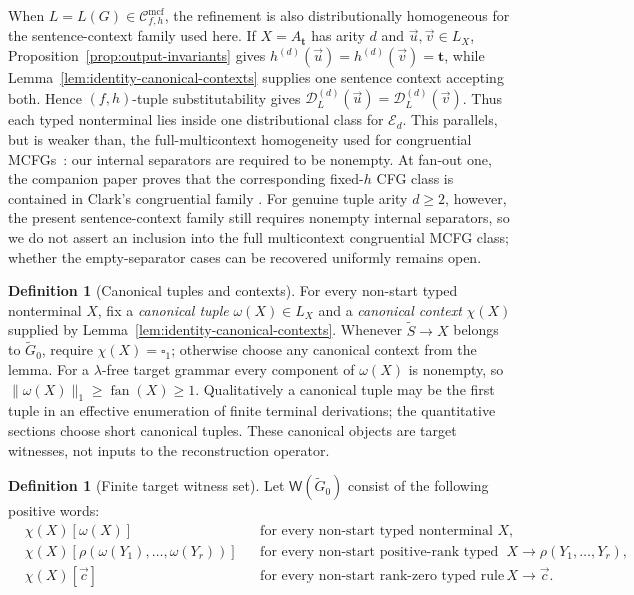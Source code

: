 \documentclass[11pt]{article}
\numberwithin{equation}{section}
\theoremstyle{plain}
\theoremstyle{definition}
\newtheorem{definition}[theorem]{Definition}
\theoremstyle{remark}
\newcommand{\Wit}{\mathsf{W}}
\newcommand{\Cmcf}[2]{\mathcal{C}^{\mathrm{mcf}}_{#1,#2}}
\newcommand{\D}{\mathcal{D}}
\newcommand{\tuple}[1]{\vec{#1}}
\newcommand{\blank}{\square}
\newcommand{\fan}{\operatorname{fan}}
\begin{document}
When $L=L(G)\in\Cmcf{f}{h}$, the refinement is also distributionally homogeneous for the sentence-context
family used here.  If $X=A_{\mathbf t}$ has arity $d$ and
$\tuple u,\tuple v\in L_X$, Proposition~\ref{prop:output-invariants} gives
$h^{(d)}(\tuple u)=h^{(d)}(\tuple v)=\mathbf t$, while
Lemma~\ref{lem:identity-canonical-contexts} supplies one sentence context
accepting both.  Hence $(f,h)$-tuple substitutability gives
$\D_L^{(d)}(\tuple u)=\D_L^{(d)}(\tuple v)$.  Thus each typed nonterminal lies
inside one distributional class for $\mathcal E_d$.  This parallels, but is weaker than, the full-multicontext homogeneity used
for congruential MCFGs~\cite{ClarkYoshinaka2016}: our internal separators are
required to be nonempty.  At fan-out one, the companion paper proves that the
corresponding fixed-$h$ CFG class is contained in Clark's congruential family
\cite{Clark2010Congruential,kuriyamaCFG}.  For genuine tuple arity $d\ge2$, however, the present
sentence-context family still requires nonempty internal separators, so we do
not assert an inclusion into the full multicontext congruential MCFG class;
whether the empty-separator cases can be recovered uniformly remains open.

\begin{definition}[Canonical tuples and contexts]
\label{def:target-canonical}
For every non-start typed nonterminal $X$, fix a \emph{canonical tuple}
$\omega(X)\in L_X$ and a \emph{canonical context} $\chi(X)$ supplied by
Lemma~\ref{lem:identity-canonical-contexts}.  Whenever
$\widetilde S\to X$ belongs to $\widetilde G_0$, require
$\chi(X)=\blank_1$; otherwise choose any canonical context from the lemma.  For
a $\lambda$-free target grammar every component of $\omega(X)$ is nonempty,
so $\|\omega(X)\|_1\ge\fan(X)\ge1$.  Qualitatively a canonical tuple may be the first
tuple in an effective enumeration of finite terminal derivations; the
quantitative sections choose short canonical tuples.  These canonical objects are target witnesses, not inputs to the reconstruction
operator.
\end{definition}

\begin{definition}[Finite target witness set]
\label{def:witness-set}
Let $\Wit(\widetilde G_0)$ consist of the following positive words:
\[
\begin{aligned}
&\chi(X)[\omega(X)]
&&\text{for every non-start typed nonterminal }X,\\
&\chi(X)[\rho(\omega(Y_1),\ldots,\omega(Y_r))]
&&\text{for every non-start positive-rank typed rule }
  X\to\rho(Y_1,\ldots,Y_r),\\
&\chi(X)[\tuple c]
&&\text{for every non-start rank-zero typed rule }X\to\tuple c.
\end{aligned}
\]
\end{definition}
\end{document}
